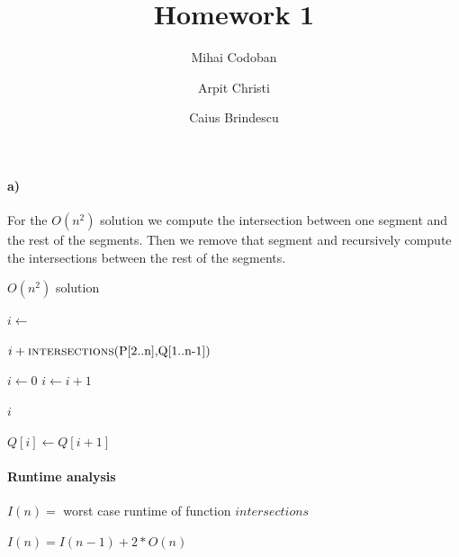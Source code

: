 \documentclass{article}
\title{Homework 1}
\author{Mihai Codoban \and Arpit Christi \and Caius Brindescu}
\begin{document}
\maketitle


\paragraph{a)} 
For the $O(n^2)$ solution we compute the intersection between one segment and the rest of the segments. Then we remove that segment and recursively compute the intersections between the rest of the segments.

\begin{algorithm}
	\caption{$O(n^2)$ solution}
	\begin{algorithmic}
	  	\State $i \gets $  
		\State {} 
	
		\Return $i + \Call{intersections}{$P[2..n]$, $Q[1..n-1]$}$
	  \EndFunction
	
		\State $i \gets 0$
			\State $i \gets i + 1$
		\EndWhile
	
		\Return $i$
	  \EndFunction
	
			\State $Q[i] \gets Q[i + 1]$
		\EndFor
	  \EndFunction
	\end{algorithmic}
\end{algorithm}

\clearpage
\paragraph{Runtime analysis} 

$I(n) =$ worst case runtime of function $intersections$

$I(n) = I(n - 1) + 2 * O(n)$
\end{document}
